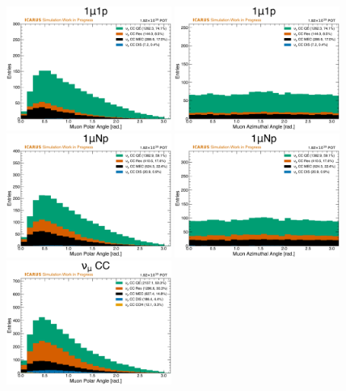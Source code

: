 \begin{figure}[!htb]
    \centering
    \includegraphics[width=0.48\textwidth]{figures/neutrino_selection/signal_hist1d_1mu1p_muon_polar_angle.pdf}
    \includegraphics[width=0.48\textwidth]{figures/neutrino_selection/signal_hist1d_1mu1p_muon_azimuthal_angle.pdf}
    \\
    \includegraphics[width=0.48\textwidth]{figures/neutrino_selection/signal_hist1d_1muNp_muon_polar_angle.pdf}
    \includegraphics[width=0.48\textwidth]{figures/neutrino_selection/signal_hist1d_1muNp_muon_azimuthal_angle.pdf}
    \\
    \includegraphics[width=0.48\textwidth]{figures/neutrino_selection/signal_hist1d_1muX_muon_polar_angle.pdf}

\end{figure}
